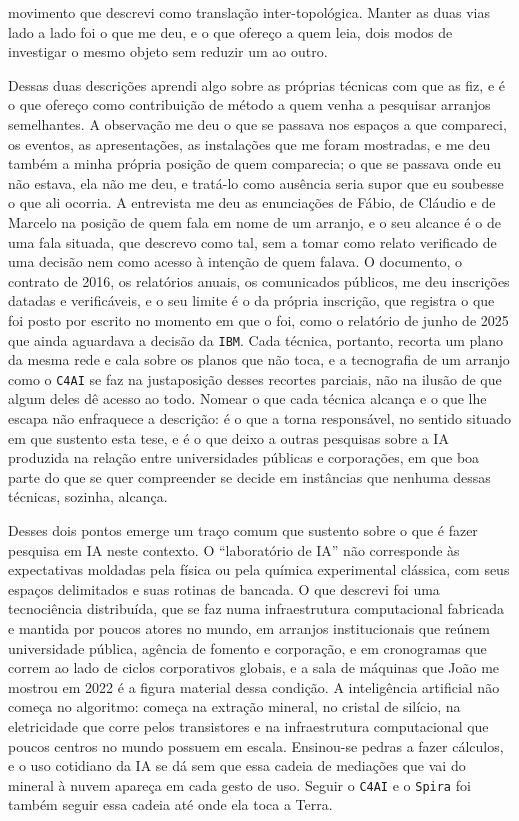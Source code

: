 movimento que descrevi como translação inter-topológica. Manter as duas vias lado a lado foi o que me deu, e o que ofereço a quem leia, dois modos de investigar o mesmo objeto sem reduzir um ao outro. 

Dessas duas descrições aprendi algo sobre as próprias técnicas com que as fiz, e é o que ofereço como contribuição de método a quem venha a pesquisar arranjos semelhantes. A observação me deu o que se passava nos espaços a que compareci, os eventos, as apresentações, as instalações que me foram mostradas, e me deu também a minha própria posição de quem comparecia; o que se passava onde eu não estava, ela não me deu, e tratá-lo como ausência seria supor que eu soubesse o que ali ocorria. A entrevista me deu as enunciações de Fábio, de Cláudio e de Marcelo na posição de quem fala em nome de um arranjo, e o seu alcance é o de uma fala situada, que descrevo como tal, sem a tomar como relato verificado de uma decisão nem como acesso à intenção de quem falava. O documento, o contrato de 2016, os relatórios anuais, os comunicados públicos, me deu inscrições datadas e verificáveis, e o seu limite é o da própria inscrição, que registra o que foi posto por escrito no momento em que o foi, como o relatório de junho de 2025 que ainda aguardava a decisão da \texttt{IBM}. Cada técnica, portanto, recorta um plano da mesma rede e cala sobre os planos que não toca, e a tecnografia de um arranjo como o \texttt{C4AI} se faz na justaposição desses recortes parciais, não na ilusão de que algum deles dê acesso ao todo. Nomear o que cada técnica alcança e o que lhe escapa não enfraquece a descrição: é o que a torna responsável, no sentido situado em que sustento esta tese, e é o que deixo a outras pesquisas sobre a IA produzida na relação entre universidades públicas e corporações, em que boa parte do que se quer compreender se decide em instâncias que nenhuma dessas técnicas, sozinha, alcança.

Desses dois pontos emerge um traço comum que sustento sobre o que é fazer pesquisa em IA neste contexto. O \enquote{laboratório de IA} não corresponde às expectativas moldadas pela física ou pela química experimental clássica, com seus espaços delimitados e suas rotinas de bancada. O que descrevi foi uma tecnociência distribuída, que se faz numa infraestrutura computacional fabricada e mantida por poucos atores no mundo, em arranjos institucionais que reúnem universidade pública, agência de fomento e corporação, e em cronogramas que correm ao lado de ciclos corporativos globais, e a sala de máquinas que João me mostrou em 2022 é a figura material dessa condição. A inteligência artificial não começa no algoritmo: começa na extração mineral, no cristal de silício, na eletricidade que corre pelos transistores e na infraestrutura computacional que poucos centros no mundo possuem em escala. Ensinou-se pedras a fazer cálculos, e o uso cotidiano da IA se dá sem que essa cadeia de mediações que vai do mineral à nuvem apareça em cada gesto de uso. Seguir o \texttt{C4AI} e o \texttt{Spira} foi também seguir essa cadeia até onde ela toca a Terra.

